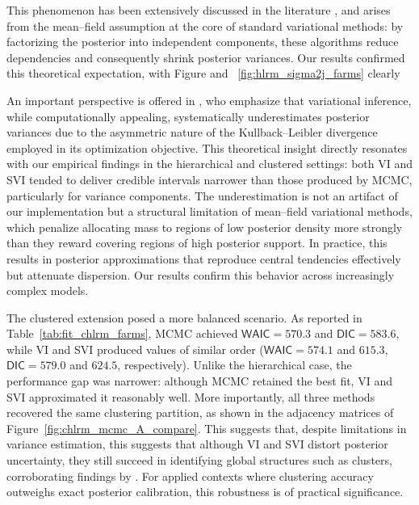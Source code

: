 \vspace{0.3cm}

This phenomenon has been extensively discussed in the literature \cite{Blei2006-kd, Wainwright2007-ul, wang22g}, and arises from the mean–field assumption at the core of standard variational methods: by factorizing the posterior into independent components, these algorithms reduce dependencies and consequently shrink posterior variances. Our results confirmed this theoretical expectation, with Figure and ~\ref{fig:hlrm_sigma2j_farms} clearly 

\vspace{0.3cm}

An important perspective is offered in \cite{Blei2016VariationalIA}, who emphasize that variational inference, while computationally appealing, systematically underestimates posterior variances due to the asymmetric nature of the Kullback–Leibler divergence employed in its optimization objective. This theoretical insight directly resonates with our empirical findings in the hierarchical and clustered settings: both VI and SVI tended to deliver credible intervals narrower than those produced by MCMC, particularly for variance components. The underestimation is not an artifact of our implementation but a structural limitation of mean–field variational methods, which penalize allocating mass to regions of low posterior density more strongly than they reward covering regions of high posterior support. In practice, this results in posterior approximations that reproduce central tendencies effectively but attenuate dispersion. Our results confirm this behavior across increasingly complex models. 

\vspace{0.3cm}

The clustered extension posed a more balanced scenario. As reported in Table~\ref{tab:fit_chlrm_farms}, MCMC achieved $\mathsf{WAIC}=570.3$ and $\mathsf{DIC}=583.6$, while VI and SVI produced values of similar order ($\mathsf{WAIC}=574.1$ and $615.3$, $\mathsf{DIC}=579.0$ and $624.5$, respectively). Unlike the hierarchical case, the performance gap was narrower: although MCMC retained the best fit, VI and SVI approximated it reasonably well. More importantly, all three methods recovered the same clustering partition, as shown in the adjacency matrices of Figure~\ref{fig:chlrm_mcmc_A_compare}. This suggests that, despite limitations in variance estimation, this suggests that although VI and SVI distort posterior uncertainty, they still succeed in identifying global structures such as clusters, corroborating findings by \cite{Blei2006-kd, HOFFMAN,beal2003variational}. For applied contexts where clustering accuracy outweighs exact posterior calibration, this robustness is of practical significance.

